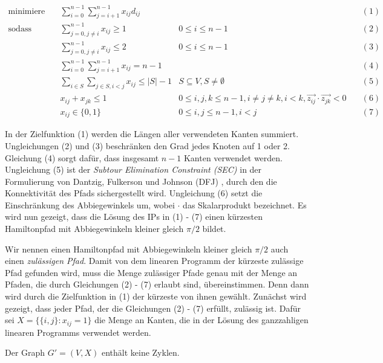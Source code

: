 \documentclass[a4paper, 10pt, ngerman]{article}
\begin{document}
\begin{align*}
    \text{minimiere} \quad & \sum_{i = 0}^{n - 1} \sum_{j = i + 1}^{n - 1} x_{ij} d_{ij} & & \quad (1) \\
    \text{sodass} \quad 
    & \sum_{j = 0, j \ne i}^{n - 1} x_{ij} \ge 1 & 0 \le i \le n - 1 & \quad (2) \\
    & \sum_{j = 0, j \ne i}^{n - 1} x_{ij} \le 2 & 0 \le i \le n - 1 & \quad (3) \\
    & \sum_{i = 0}^{n - 1} \sum_{j = i + 1}^{n - 1} x_{ij} = n - 1 & & \quad (4) \\
    & \sum_{i \in S} \sum_{j \in S, i < j} x_{ij} \le |S| - 1 & S \subseteq V, S \ne \emptyset & \quad (5) \\
    & x_{ij} + x_{jk} \le 1 & 0 \le i, j, k \le n - 1, i \ne j \ne k, i < k, \vec{z_{ij}} \cdot \vec{z_{jk}} < 0 & \quad (6) \\
    & x_{ij} \in \{0, 1\} & 0 \le i, j \le n - 1, i < j & \quad (7)
\end{align*}
\smallskip

In der Zielfunktion (1) werden die Längen aller verwendeten Kanten summiert. Ungleichungen (2) und (3) beschränken den Grad jedes Knoten auf 1 oder 2. Gleichung (4) sorgt dafür, dass insgesamt $n - 1$ Kanten verwendet werden. Ungleichung (5) ist der \emph{Subtour Elimination Constraint (SEC)} in der Formulierung von Dantzig, Fulkerson und Johnson (DFJ) \cite{tsp-formulations}, durch den die Konnektivität des Pfads sichergestellt wird. Ungleichung (6) setzt die Einschränkung des Abbiegewinkels um, wobei $\cdot$ das Skalarprodukt bezeichnet. Es wird nun gezeigt, dass die Lösung des IPs in (1) - (7) einen kürzesten Hamiltonpfad mit Abbiegewinkeln kleiner gleich $\pi / 2$ bildet. 

Wir nennen einen Hamiltonpfad mit Abbiegewinkeln kleiner gleich $\pi / 2$ auch einen \emph{zulässigen Pfad}. Damit von dem linearen Programm der kürzeste zulässige Pfad gefunden wird, muss die Menge zulässiger Pfade genau mit der Menge an Pfaden, die durch Gleichungen (2) - (7) erlaubt sind, übereinstimmen. Denn dann wird durch die Zielfunktion in (1) der kürzeste von ihnen gewählt. Zunächst wird gezeigt, dass jeder Pfad, der die Gleichungen (2) - (7) erfüllt, zulässig ist. Dafür sei $X = \{\{i, j\} : x_{ij} = 1\}$ die Menge an Kanten, die in der Lösung des ganzzahligen linearen Programms verwendet werden.

\begin{lemma}
    Der Graph $G' = (V, X)$ enthält keine Zyklen.
\end{lemma}
\end{document}
